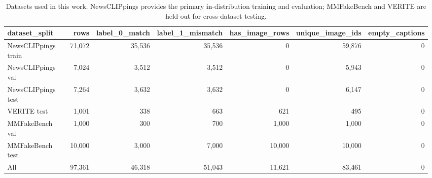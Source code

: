 \begin{table}[!t]
\centering
\caption{Datasets used in this work. NewsCLIPpings provides the primary in-distribution training and evaluation; MMFakeBench and VERITE are held-out for cross-dataset testing.}
\label{tab:datasets}
\begin{tabular}{lrrrrrr}
\toprule
\textbf{dataset_split} & \textbf{rows} & \textbf{label_0_match} & \textbf{label_1_mismatch} & \textbf{has_image_rows} & \textbf{unique_image_ids} & \textbf{empty_captions} \\
\midrule
NewsCLIPpings train & 71,072 & 35,536 & 35,536 & 0 & 59,876 & 0 \\
NewsCLIPpings val & 7,024 & 3,512 & 3,512 & 0 & 5,943 & 0 \\
NewsCLIPpings test & 7,264 & 3,632 & 3,632 & 0 & 6,147 & 0 \\
VERITE test & 1,001 & 338 & 663 & 621 & 495 & 0 \\
MMFakeBench val & 1,000 & 300 & 700 & 1,000 & 1,000 & 0 \\
MMFakeBench test & 10,000 & 3,000 & 7,000 & 10,000 & 10,000 & 0 \\
All & 97,361 & 46,318 & 51,043 & 11,621 & 83,461 & 0 \\
\bottomrule
\end{tabular}
\end{table}
